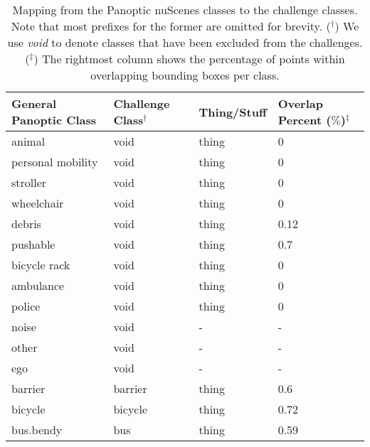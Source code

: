 \documentclass[letterpaper, 10 pt, journal, twoside]{IEEEtran}
\begin{document}
\begin{table}
\setlength\tabcolsep{2.0pt}
\footnotesize
\centering
\caption{Mapping from the Panoptic nuScenes classes to the challenge classes. Note that most prefixes for the former are omitted for brevity. ($^{\dagger}$) We use \emph{void} to denote classes that have been excluded from the challenges. ($^{\ddagger}$) The rightmost column shows the percentage of points within overlapping bounding boxes per class.}
\begin{tabular}{|l | C{2.0cm} | C{1.5cm}| C{1.5cm} |}
\toprule
General Panoptic Class &  Challenge Class$^{\dagger}$ &  Thing/Stuff & Overlap Percent ($\%$)$^{\ddagger}$ \\ 
\midrule
animal                                   &   void                  & thing    & 0      \\
personal mobility                        &   void                  & thing   & 0       \\
stroller                                 &   void                  & thing   & 0       \\
wheelchair                               &   void                  & thing  & 0        \\
debris                                   &   void                  & thing  & 0.12        \\
pushable                                 &   void                  & thing  & 0.7        \\
bicycle rack                             &   void                  & thing  & 0        \\ 
ambulance                                &   void                  & thing  & 0        \\ 
police                                   &   void                  & thing  & 0        \\
noise                                    &   void                  & -    & -          \\ 
other                                    &   void                  & -    & -          \\ 
ego                                      &   void                  & -    & -          \\ 
barrier                                  &   barrier               & thing  & 0.6        \\ 
bicycle                                  &   bicycle               & thing  & 0.72        \\ 
bus.bendy                                &   bus                   & thing   & 0.59       \\ 

\end{tabular}
\end{table}
\end{document}
